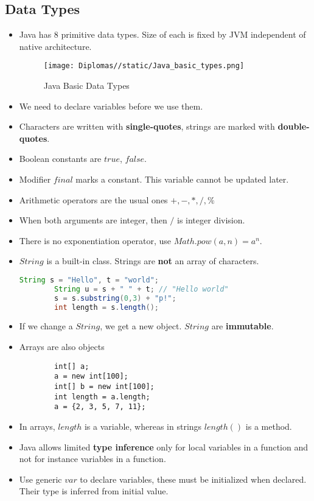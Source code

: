 \documentclass[a4paper]{article}
\begin{document}
\subsection{Data Types}
\begin{itemize}
    \item Java has 8 primitive data types. Size of each is fixed by JVM independent of native architecture.
    \begin{figure}[H]
        \centering
        \texttt{[image: Diplomas//static/Java\_basic\_types.png]}
        \caption{Java Basic Data Types}
        \label{fig:Java-basic-types}
    \end{figure}
    \item We need to declare variables before we use them.
    \item Characters are written with \textbf{single-quotes}, strings are marked with \textbf{double-quotes}.
    \item Boolean constants are $true$, $false$.
    \item Modifier $final$ marks a constant. This variable cannot be updated later.
    \item Arithmetic operators are the usual ones $+,-,*,/,\%$
    \item When both arguments are integer, then $/$ is integer division.
    \item There is no exponentiation operator, use $Math.pow(a,n)=a^n$.
    \item $String$ is a built-in class. Strings are \textbf{not} an array of characters.
    \begin{lstlisting}[language=Java]
        String s = "Hello", t = "world";
        String u = s + " " + t; // "Hello world"
        s = s.substring(0,3) + "p!";
        int length = s.length();
    \end{lstlisting}
    \item If we change a $String$, we get a new object. $String$ are \textbf{immutable}.
    \item Arrays are also objects
    \begin{lstlisting}
        int[] a;
        a = new int[100];
        int[] b = new int[100];
        int length = a.length;
        a = {2, 3, 5, 7, 11};
    \end{lstlisting}
    \item In arrays, $length$ is a variable, whereas in strings $length()$ is a method. 
    \item Java allows limited \textbf{type inference} only for local variables in a function and not for instance variables in a function.
    \item Use generic $var$ to declare variables, these must be initialized when declared. Their type is inferred from initial value.
\end{itemize}
\end{document}
